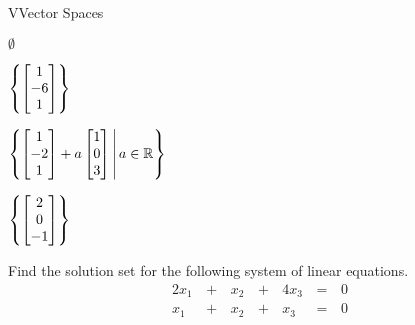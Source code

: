 \documentclass{article}[12pt]
\begin{document}
\begin{module}{V}{Vector Spaces}
\begin{readinessAssuranceTest}
    \begin{multicols}{2}
    \begin{readinessAssuranceTestChoices}
    \item \(\emptyset\)
    \item \(
            \left\{
            \begin{bmatrix}
              1 \\ -6 \\ 1
            \end{bmatrix}
            \right\}
          \)
    \item \(
            \left\{
            \begin{bmatrix}
              1 \\ -2 \\ 1
            \end{bmatrix}+
            a
            \begin{bmatrix}
              1 \\ 0 \\ 3
            \end{bmatrix}
          \,\middle|\,a\in\mathbb{R}\right\}
        \)
      \item \(
          \left\{
            \begin{bmatrix}
              2 \\ 0 \\ -1
            \end{bmatrix}
          \right\}
          \) %
    \end{readinessAssuranceTestChoices}
    \end{multicols}

    \item Find the solution set for the following system of linear equations.
    \begin{alignat*}{4}
      2x_1 &\,+\,& x_2 &\,+\,& 4x_3 &\,=\,& 0 \\
       x_1 &\,+\,& x_2 &\,+\,&  x_3 &\,=\,& 0 \\
    \end{alignat*}


\end{readinessAssuranceTest}
\end{module}
\end{document}
